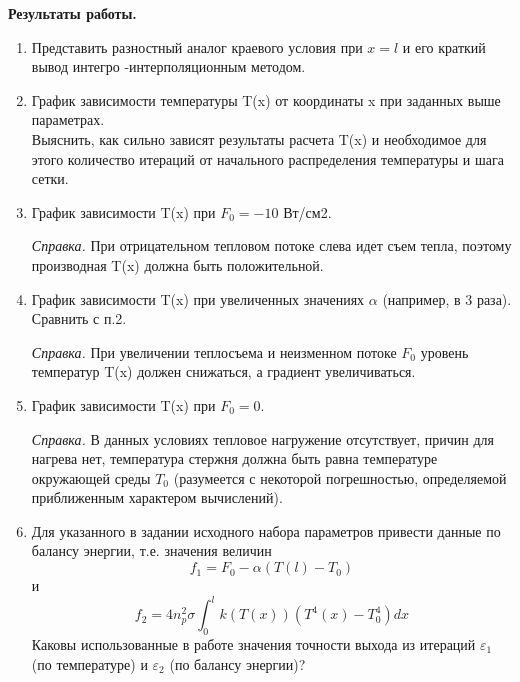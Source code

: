 \textbf{Результаты работы.}
\begin{enumerate}
	\item Представить разностный аналог краевого условия при $x = l$
	и его краткий вывод интегро -интерполяционным методом.
	\item График зависимости температуры T(x) от координаты x при заданных выше параметрах.\\
	Выяснить, как сильно зависят результаты расчета T(x) и необходимое для этого количество итераций от начального распределения температуры и шага сетки.
	\item График зависимости T(x) при $F_0 = -10$ Вт/см2. 
	
	\qquad \textit{Справка.} При отрицательном тепловом потоке слева идет съем тепла, поэтому
	производная T(x) должна быть положительной.
	\item График зависимости T(x) при увеличенных значениях $\alpha$ (например, в 3 раза). Сравнить с п.2.
	
	\qquad \textit{Справка.} При увеличении теплосъема и неизменном потоке $F_0$ уровень температур T(x)
	должен снижаться, а градиент увеличиваться.
	\item График зависимости T(x) при $F_0 = 0$.
	
	\qquad \textit{Справка.} В данных условиях тепловое нагружение отсутствует, причин для
	нагрева нет, температура стержня должна быть равна температуре окружающей
	среды $T_0$ (разумеется с некоторой погрешностью, определяемой приближенным
	характером вычислений).
	\item Для указанного в задании исходного набора параметров привести данные по балансу
	энергии, т.е. значения величин
	\begin{equation}\label{formula7}
		f_1 = F_0 - \alpha(T(l) - T_0)
	\end{equation}
	и
	\begin{equation}\label{formula8}
		f_2 = 4n_p^2 \sigma \int_0^l k(T(x))(T^4(x) - T_0^4)dx
	\end{equation}
	Каковы использованные в работе значения точности выхода из итераций
	$\varepsilon_1$ (по температуре) и
	$\varepsilon_2$ (по балансу энергии)?

\end{enumerate}



